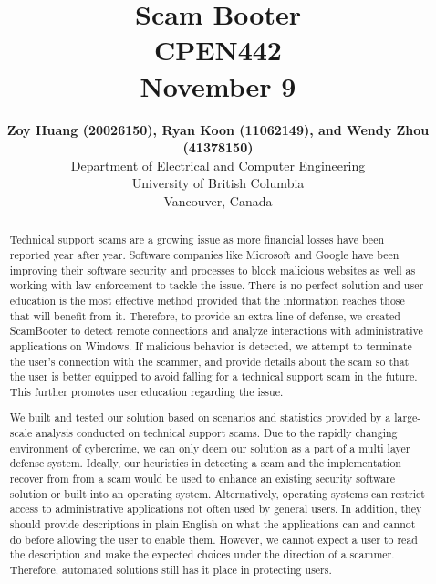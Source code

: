 \documentclass[final]{IEEEtran}
\begin{document}
\title{ Scam Booter\\\vspace*{10pt} \LARGE CPEN442 \\\vspace*{10pt} \large November 9}
\author{\textbf{Zoy Huang (20026150), Ryan Koon (11062149), and Wendy Zhou (41378150)}\\
Department of Electrical and Computer Engineering\\
University of British Columbia\\
Vancouver, Canada

}
\maketitle

\begin{abstract}
Technical support scams are a growing issue as more financial losses have been reported year after year. Software companies like Microsoft and Google have been improving their software security and processes to block malicious websites as well as working with law enforcement to tackle the issue. There is no perfect solution and user education is the most effective method provided that the information reaches those that will benefit from it. Therefore, to provide an extra line of defense, we created ScamBooter to detect remote connections and analyze interactions with administrative applications on Windows. If malicious behavior is detected, we attempt to terminate the user’s connection with the scammer, and provide details about the scam so that the user is better equipped to avoid falling for a technical support scam in the future. This further promotes user education regarding the issue.

We built and tested our solution based on scenarios and statistics provided by a large-scale analysis conducted on technical support scams. Due to the rapidly changing environment of cybercrime, we can only deem our solution as a part of a multi layer defense system. Ideally, our heuristics in detecting a scam and the implementation recover from from a scam would be used to enhance an existing security software solution or built into an operating system. Alternatively, operating systems can restrict access to administrative applications not often used by general users. In addition, they should provide descriptions in plain English on what the applications can and cannot do before allowing the user to enable them. However, we cannot expect a user to read the description and make the expected choices under the direction of a scammer. Therefore, automated solutions still has it place in protecting users.
\end{abstract}
\end{document}
